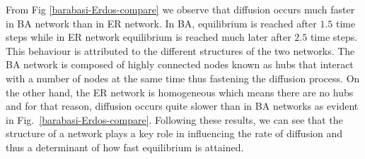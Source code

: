\documentclass[10pt,a4paper]{article}
\begin{document}
      From Fig \ref{barabasi-Erdos-compare} we observe that diffusion occurs much faster in BA network than in ER network. In BA, equilibrium is reached after $1.5$ time steps while in ER network equilibrium is reached much later after $2.5$ time steps. This behaviour is attributed to the different structures of the two networks. The BA network is composed of highly connected nodes known as hubs that interact with a number of nodes at the same time thus fastening the diffusion process. On the other hand, the ER network is homogeneous which means there are no hubs and for that reason, diffusion occurs quite slower than in BA networks as evident in Fig.~\ref{barabasi-Erdos-compare}. Following these results, we can see that the structure of a network plays a key role in influencing the rate of diffusion and thus a determinant of how fast equilibrium is attained.
      
\end{document}
